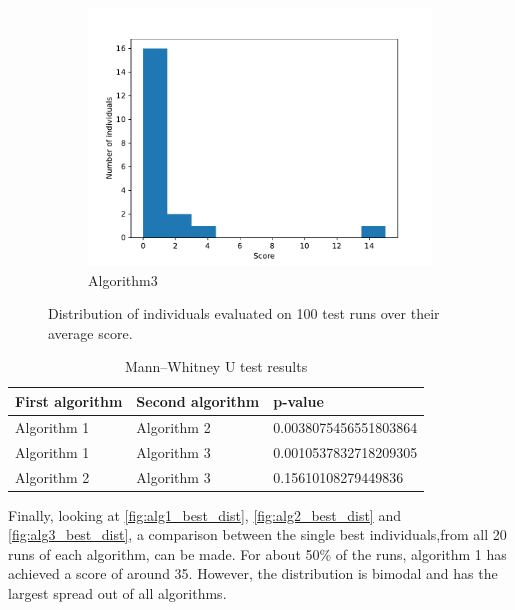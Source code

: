 \documentclass[12pt,a4paper]{article}
\begin{document}
\begin{figure}[h!]
\begin{subfigure}{.33\textwidth}
				\includegraphics[width=\linewidth]{../code/plots/alg3_bests_dist}
				\caption{Algorithm3}
				\label{fig:alg3_bests_dist}
			\end{subfigure}
			
			\caption{Distribution of individuals evaluated on 100 test runs over their average score.}
			\label{fig:bests_dist}
		\end{figure}
		
		
		\begin{table}[h!]
			\centering
			\begin{tabu} to \textwidth {|X[l]|X[l]|X[l]|}
				\hline
				\textbf{First algorithm} & \textbf{Second algorithm} & \textbf{p-value} \\ \hline
				Algorithm 1 & Algorithm 2 & 0.0038075456551803864 \\ \hline
				Algorithm 1 & Algorithm 3 & 0.0010537832718209305 \\ \hline
				Algorithm 2 & Algorithm 3 & 0.15610108279449836   \\ \hline
			\end{tabu}
			
			\caption{Mann–Whitney U test results}
			\label{table:u-test}
		\end{table}	
		
		Finally, looking at \autoref{fig:alg1_best_dist}, \autoref{fig:alg2_best_dist} and \autoref{fig:alg3_best_dist}, a comparison between the single best individuals,from all 20 runs of each algorithm, can be made. For about 50\% of the runs, algorithm 1 has achieved a score of around 35. However, the distribution is bimodal and has the largest spread out of all algorithms.
		
\end{document}
